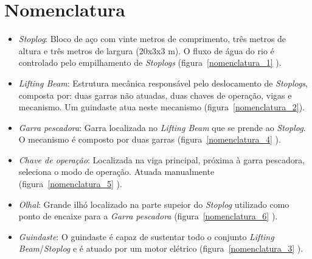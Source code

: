 

\chapter{Nomenclatura}
\begin{itemize}

\item \emph{Stoplog}: Bloco de aço com vinte metros de comprimento, três metros
de altura e três metros de largura (20x3x3 m). O fluxo de água do rio é
controlado pelo empilhamento de \emph{Stoplogs} (figura~\ref{nomenclatura_1} ).


\item \emph{Lifting Beam}: Estrutura mecânica responsável pelo deslocamento de
\emph{Stoplogs}, composta por: duas garras não atuadas, duas chaves de operação, vigas e mecanismo. Um guindaste atua neste mecanismo (figura~\ref{nomenclatura_2}).

\item \emph{Garra pescadora}: Garra localizada no \emph{Lifting Beam} que se
prende ao \emph{Stoplog}. O mecanismo é composto por duas garras (figura~\ref{nomenclatura_4} ).

\item \emph{Chave de operação}: Localizada na viga principal, próxima à garra
pescadora, seleciona o modo de operação.  Atuada manualmente (figura~\ref{nomenclatura_5} ).

\item \emph{Olhal}: Grande ilhó localizado na parte supeior do \emph{Stoplog}
utilizado como ponto de encaixe para a \emph{Garra pescadora}
(figura~\ref{nomenclatura_6} ).

\item \emph{Guindaste}: O guindaste é capaz de sustentar todo o conjunto
\emph{Lifting Beam}/\emph{Stoplog} e é atuado por um motor elétrico
(figura~\ref{nomenclatura_3} ).

\end{itemize}

